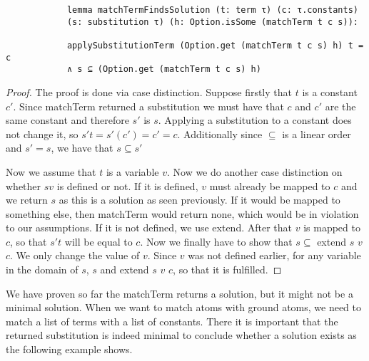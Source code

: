 \documentclass{article}
\begin{document}
        \begin{lstlisting}
            lemma matchTermFindsSolution (t: term τ) (c: τ.constants) 
            (s: substitution τ) (h: Option.isSome (matchTerm t c s)): 

            applySubstitutionTerm (Option.get (matchTerm t c s) h) t = c 
            ∧ s ⊆ (Option.get (matchTerm t c s) h)
        \end{lstlisting}
        \begin{proof}
        The proof is done via case distinction. Suppose firstly that $t$ is a constant $c'$. Since matchTerm returned a substitution we must have that $c$ and $c'$ are the same constant and therefore $s'$ is $s$. Applying a substitution to a constant does not change it, so $s' t = s' (c') = c' = c$. Additionally since $\subseteq$ is a linear order and $s' = s$, we have that $s \subseteq s'$

        Now we assume that $t$ is a variable $v$. Now we do another case distinction on whether $s v$ is defined or not. If it is defined, $v$ must already be mapped to $c$ and we return $s$ as this is a solution as seen previously. If it would be mapped to something else, then matchTerm would return none, which would be in violation to our assumptions.
        If it is not defined, we use extend. After that $v$ is mapped to $c$, so that $s' t$ will be equal to $c$. Now we finally have to show that $s \subseteq$ extend $s$ $v$ $c$. We only change the value of $v$. Since $v$ was not defined earlier, for any variable in the domain of $s$, $s$ and extend $s$ $v$ $c$, so that it is fulfilled.
        \end{proof}

        We have proven so far the matchTerm returns a solution, but it might not be a minimal solution. When we want to match atoms with ground atoms, we need to match a list of terms with a list of constants. There it is important that the returned substitution is indeed minimal to conclude whether a solution exists as the following example shows.
\end{document}
